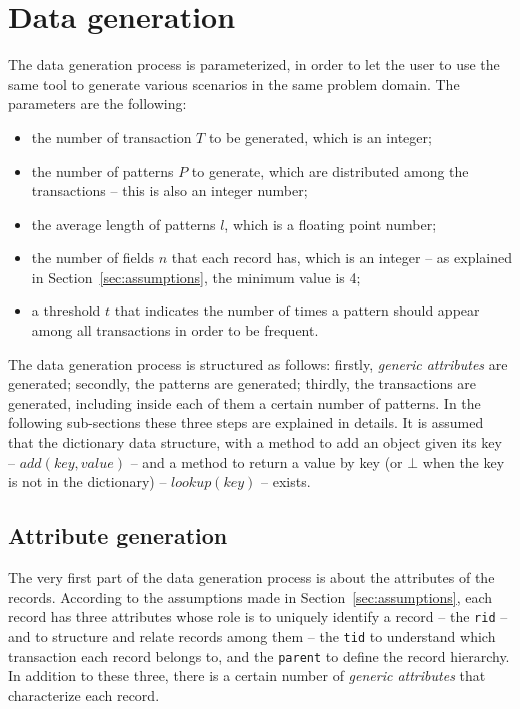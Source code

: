 \documentclass{acm_proc_article-sp-sigmod09}
\begin{document}
\section{Data generation}
\label{sec:generation}
The data generation process is parameterized, in order to let the user to use the same tool to generate various scenarios in the same problem domain. The parameters are the following:
\begin{itemize}
\item the number of transaction $T$ to be generated, which is an integer;
\item the number of patterns $P$ to generate, which are distributed among the transactions -- this is also an integer number;
\item the average length of patterns $l$, which is a floating point number;
\item the number of fields $n$ that each record has, which is an integer -- as explained in Section~\ref{sec:assumptions}, the minimum value is 4;
\item a threshold $t$ that indicates the number of times a pattern should appear among all transactions in order to be frequent.
\end{itemize} 
The data generation process is structured as follows: firstly, \emph{generic attributes} are generated; secondly, the patterns are generated; thirdly, the transactions are generated, including inside each of them a certain number of patterns. In the following sub-sections these three steps are explained in details. It is assumed that the dictionary data structure, with a method to add an object given its key -- $add(key, value)$ -- and a method to return a value by key (or $\bot$ when the key is not in the dictionary) -- $lookup(key)$ -- exists.

\subsection{Attribute generation}
The very first part of the data generation process is about the attributes of the records. According to the assumptions made in Section~\ref{sec:assumptions}, each record has three attributes whose role is to uniquely identify a record -- the \texttt{rid} -- and to structure and relate records among them -- the \texttt{tid} to understand which transaction each record belongs to, and the \texttt{parent} to define the record hierarchy. In addition to these three, there is a certain number of \emph{generic attributes} that characterize each record.
\end{document}
